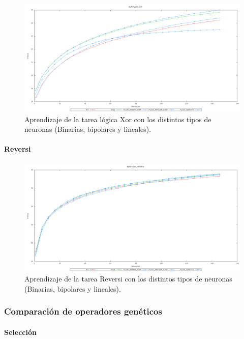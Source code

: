\documentclass[11pt]{article}
\begin{document}
\begin{titlepage}
\begin{figure}[htb]
\centering
\includegraphics[width=\textwidth]{./img/BufferTypes_XOR.png}
\caption{\label{aprenDiscretXor}Aprendizaje de la tarea lógica Xor con los distintos tipos de neuronas (Binarias, bipolares y lineales).}
\end{figure}

\newpage
\paragraph{Reversi}
\label{sec-6-2-2-4}


\begin{figure}[htb]
\centering
\includegraphics[width=\textwidth]{./img/BufferTypes_REVERSI.png}
\caption{\label{aprenDiscretReversi}Aprendizaje de la tarea Reversi con los distintos tipos de neuronas (Binarias, bipolares y lineales).}
\end{figure}

\newpage
\subsubsection{Comparaci\'on de operadores gen\'eticos}
\label{sec-6-2-3}

   \label{}
\paragraph{Selección}
\label{sec-6-2-3-1}



\end{titlepage}
\end{document}
